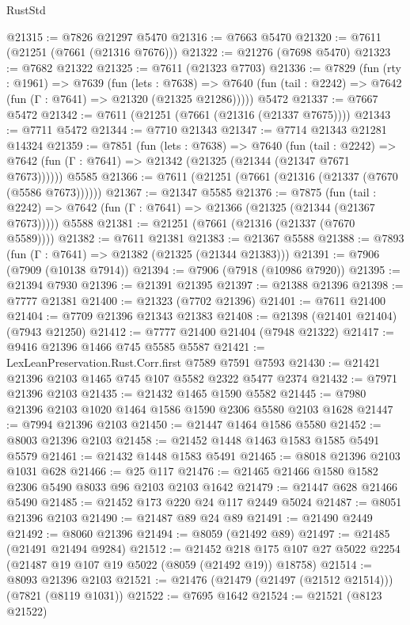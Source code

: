 \begin{lexlean}{RustStd}
\begin{coremodule}
@21315 := @7826 @21297 @5470
@21316 := @7663 @5470
@21320 := @7611 (@21251 (@7661 (@21316 @7676)))
@21322 := @21276 (@7698 @5470)
@21323 := @7682 @21322
@21325 := @7611 (@21323 @7703)
@21336 := @7829
    (fun (rty : @1961) =>
    @7639
      (fun (lets : @7638) =>
      @7640 (fun (tail : @2242) => @7642 (fun (Γ : @7641) => @21320 (@21325 @21286)))))
    @5472
@21337 := @7667 @5472
@21342 := @7611 (@21251 (@7661 (@21316 (@21337 @7675))))
@21343 := @7711 @5472
@21344 := @7710 @21343
@21347 := @7714 @21343 @21281 @14324
@21359 := @7851
    (fun (lets : @7638) =>
    @7640
      (fun (tail : @2242) =>
      @7642 (fun (Γ : @7641) => @21342 (@21325 (@21344 (@21347 @7671 @7673))))))
    @5585
@21366 := @7611 (@21251 (@7661 (@21316 (@21337 (@7670 (@5586 @7673))))))
@21367 := @21347 @5585
@21376 := @7875
    (fun (tail : @2242) => @7642 (fun (Γ : @7641) => @21366 (@21325 (@21344 (@21367 @7673)))))
    @5588
@21381 := @21251 (@7661 (@21316 (@21337 (@7670 @5589))))
@21382 := @7611 @21381
@21383 := @21367 @5588
@21388 := @7893 (fun (Γ : @7641) => @21382 (@21325 (@21344 @21383)))
@21391 := @7906 (@7909 (@10138 @7914))
@21394 := @7906 (@7918 (@10986 @7920))
@21395 := @21394 @7930
@21396 := @21391 @21395
@21397 := @21388 @21396
@21398 := @7777 @21381
@21400 := @21323 (@7702 @21396)
@21401 := @7611 @21400
@21404 := @7709 @21396 @21343 @21383
@21408 := @21398 (@21401 @21404) (@7943 @21250)
@21412 := @7777 @21400 @21404 (@7948 @21322)
@21417 := @9416 @21396 @1466 @745 @5585 @5587
@21421 := LexLeanPreservation.Rust.Corr.first @7589 @7591 @7593
@21430 := @21421 @21396 @2103 @1465 @745 @107 @5582 @2322 @5477 @2374
@21432 := @7971 @21396 @2103
@21435 := @21432 @1465 @1590 @5582
@21445 := @7980 @21396 @2103 @1020 @1464 @1586 @1590 @2306 @5580 @2103 @1628
@21447 := @7994 @21396 @2103
@21450 := @21447 @1464 @1586 @5580
@21452 := @8003 @21396 @2103
@21458 := @21452 @1448 @1463 @1583 @1585 @5491 @5579
@21461 := @21432 @1448 @1583 @5491
@21465 := @8018 @21396 @2103 @1031 @628
@21466 := @25 @117
@21476 := @21465 @21466 @1580 @1582 @2306 @5490 @8033 @96 @2103 @2103 @1642
@21479 := @21447 @628 @21466 @5490
@21485 := @21452 @173 @220 @24 @117 @2449 @5024
@21487 := @8051 @21396 @2103
@21490 := @21487 @89 @24 @89
@21491 := @21490 @2449
@21492 := @8060 @21396
@21494 := @8059 (@21492 @89)
@21497 := @21485 (@21491 @21494 @9284)
@21512 := @21452
    @218
    @175
    @107
    @27
    @5022
    @2254
    (@21487 @19 @107 @19 @5022 (@8059 (@21492 @19)) @18758)
@21514 := @8093 @21396 @2103
@21521 := @21476 (@21479 (@21497 (@21512 @21514))) (@7821 (@8119 @1031))
@21522 := @7695 @1642
@21524 := @21521 (@8123 @21522)

\end{coremodule}
\end{lexlean}
